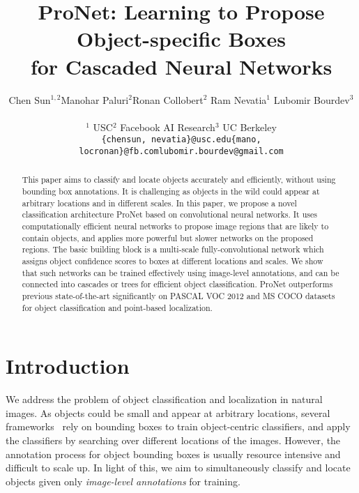 \documentclass[10pt,twocolumn,letterpaper]{article}
\begin{document}
\title{ProNet: Learning to Propose Object-specific Boxes\\ for Cascaded Neural Networks}

\author{Chen Sun$^{1,2}$\quad Manohar Paluri$^2$\quad Ronan Collobert$^2$
       \quad Ram Nevatia$^1$ \quad Lubomir Bourdev$^3$
       \\
       \begin{tabular}{ccc}
       $^1$ USC & $^2$ Facebook AI Research & $^3$ UC Berkeley\\
        {\tt\small\{chensun, nevatia\}@usc.edu} & {\tt\small\{mano, locronan\}@fb.com} & {\tt\small lubomir.bourdev@gmail.com}
       \end{tabular}
       }

\maketitle


\begin{abstract}
This paper aims to classify and locate objects accurately and efficiently, without using bounding box annotations. It is challenging as objects in the wild could appear at arbitrary locations and in different scales. 
In this paper, we propose a novel classification architecture ProNet based on convolutional neural networks. 
It uses computationally efficient neural networks to propose image regions that are likely to contain objects, and applies more powerful but slower networks on the proposed regions. The basic building block is a multi-scale fully-convolutional network which assigns object confidence scores to boxes at different locations and scales. We show that such networks can be trained effectively using image-level annotations, and can be connected into cascades or trees for efficient object classification. ProNet outperforms previous state-of-the-art significantly on PASCAL VOC 2012 and MS COCO datasets for object classification and point-based localization.
\end{abstract}






\section{Introduction}



We address the problem of object classification and localization in natural images. As objects could be small and appear at arbitrary locations, several frameworks~\cite{DBLP:conf/cvpr/OquabBLS14,NUS-PSL} rely on bounding boxes to train object-centric classifiers, and apply the classifiers by searching over different locations of the images. However, the annotation process for object bounding boxes is usually resource intensive and difficult to scale up. In light of this, we aim to simultaneously classify and locate objects given only \textit{image-level annotations} for training.
\end{document}
